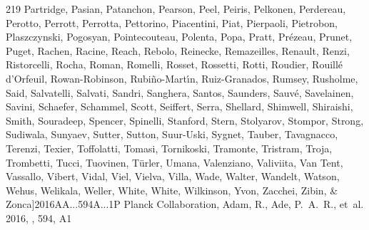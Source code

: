 \documentclass{aa}
\begin{document}
\begin{thebibliography}{219}
{		{Partridge}, {Pasian}, {Patanchon}, {Pearson}, {Peel}, {Peiris}, {Pelkonen}, {Perdereau}, {Perotto}, {Perrott}, {Perrotta}, {Pettorino}, {Piacentini}, {Piat}, {Pierpaoli}, {Pietrobon}, {Plaszczynski}, {Pogosyan}, {Pointecouteau}, {Polenta}, {Popa}, {Pratt}, {Pr{\'e}zeau}, {Prunet}, {Puget}, {Rachen}, {Racine}, {Reach}, {Rebolo}, {Reinecke}, {Remazeilles}, {Renault}, {Renzi}, {Ristorcelli}, {Rocha}, {Roman}, {Romelli}, {Rosset}, {Rossetti}, {Rotti}, {Roudier}, {Rouill{\'e} d'Orfeuil}, {Rowan-Robinson}, {Rubi{\~n}o-Mart{\'\i}n}, {Ruiz-Granados}, {Rumsey}, {Rusholme}, {Said}, {Salvatelli}, {Salvati}, {Sandri}, {Sanghera}, {Santos}, {Saunders}, {Sauv{\'e}}, {Savelainen}, {Savini}, {Schaefer}, {Schammel}, {Scott}, {Seiffert}, {Serra}, {Shellard}, {Shimwell}, {Shiraishi}, {Smith}, {Souradeep}, {Spencer}, {Spinelli}, {Stanford}, {Stern}, {Stolyarov}, {Stompor}, {Strong}, {Sudiwala}, {Sunyaev}, {Sutter}, {Sutton}, {Suur-Uski}, {Sygnet}, {Tauber}, {Tavagnacco}, {Terenzi}, {Texier}, {Toffolatti}, {Tomasi},
		{Tornikoski}, {Tramonte}, {Tristram}, {Troja}, {Trombetti}, {Tucci}, {Tuovinen}, {T{\"u}rler}, {Umana}, {Valenziano}, {Valiviita}, {Van Tent}, {Vassallo}, {Vibert}, {Vidal}, {Viel}, {Vielva}, {Villa}, {Wade}, {Walter}, {Wandelt}, {Watson}, {Wehus}, {Welikala}, {Weller}, {White}, {White}, {Wilkinson}, {Yvon}, {Zacchei}, {Zibin}, \& {Zonca}}]{2016AA...594A...1P}
	{Planck Collaboration}, {Adam}, R., {Ade}, P.~A.~R., {et~al.} 2016, \aap, 594, A1
	

\end{thebibliography}
\end{document}

